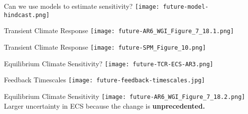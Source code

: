 

\begin{frame}{Can we use models to estimate sensitivity?}
    \centering
    \texttt{[image: future-model-hindcast.png]}


\end{frame}

\begin{frame}{Transient Climate Response}
    \centering
    \texttt{[image: future-AR6\_WGI\_Figure\_7\_18.1.png]}
\end{frame}

\begin{frame}{Transient Climate Response}
    \centering
    \texttt{[image: future-SPM\_Figure\_10.png]}
\end{frame}

\begin{frame}{Equilibrium Climate Sensitivity?}
    \centering
    \texttt{[image: future-TCR-ECS-AR3.png]}
\end{frame}

\begin{frame}{Feedback Timescales}
    \centering
    \texttt{[image: future-feedback-timescales.jpg]}
\end{frame}

\begin{frame}{Equilibrium Climate Sensitivity}
    \centering
    \texttt{[image: future-AR6\_WGI\_Figure\_7\_18.2.png]}
    Larger uncertainty in ECS because the change is \textbf{unprecedented.}
\end{frame}

